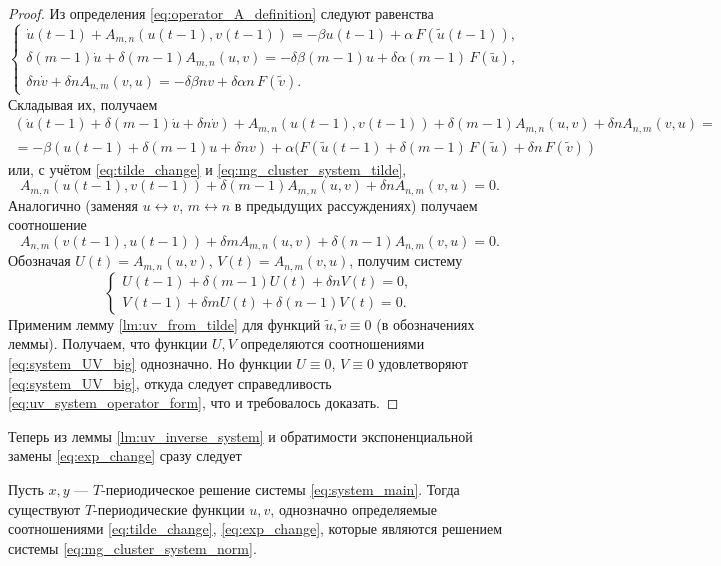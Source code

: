 \begin{proof}
	Из определения \eqref{eq:operator_A_definition} следуют равенства
	\[
	\begin{cases}
		\dot{u}(t - 1) + A_{m, n}(u(t - 1), v(t - 1))  = -\beta u(t - 1) + \alpha \, F(\tilde{u}(t - 1)),\\
		\delta (m - 1)\dot{u} + \delta (m - 1) A_{m, n}(u, v)  = -\delta \beta (m - 1) u + \delta \alpha (m - 1) \, F(\tilde{u}),\\
		\delta n \dot{v} + \delta n A_{n, m}(v, u)  = -\delta \beta n v + \delta \alpha n \, F(\tilde{v}).
	\end{cases}
	\]
	Складывая их, получаем
	\small
	\begin{multline*}   
		(\dot{u}(t - 1) + \delta (m - 1)\dot{u} + \delta n\dot{v}) + A_{m, n}(u(t - 1), v(t - 1)) + \delta (m - 1) A_{m, n}(u, v) + \delta n A_{n, m}(v, u) =\\= -\beta(u(t - 1) + \delta (m - 1) u + \delta n v) + \alpha(F(\tilde{u}(t - 1) + \delta (m - 1) \, F(\tilde{u}) + \delta n \, F(\tilde{v}))
	\end{multline*}
	\normalsize
	или, с учётом \eqref{eq:tilde_change} и \eqref{eq:mg_cluster_system_tilde},
	\[
	A_{m, n}(u(t - 1), v(t - 1)) + \delta (m - 1) A_{m, n}(u, v) + \delta n A_{n, m}(v, u) = 0.
	\]
	Аналогично (заменяя $u \leftrightarrow v$, $m \leftrightarrow n$ в предыдущих рассуждениях) получаем соотношение
	\[
	A_{n, m}(v(t - 1), u(t - 1)) + \delta m A_{m, n}(u, v) + \delta (n - 1) A_{n, m}(v, u) = 0.
	\]
	Обозначая $U(t) = A_{m, n}(u, v)$, $V(t) = A_{n, m}(v, u)$, получим систему
	\begin{equation}
		\label{eq:system_UV_big}
		\begin{cases}
			U(t - 1) + \delta (m - 1)U(t) + \delta n V(t) = 0,\\
			V(t - 1) + \delta m U(t) + \delta (n - 1) V(t) = 0.
		\end{cases}
	\end{equation}
	Применим лемму \ref{lm:uv_from_tilde} для функций $\tilde{u}, \tilde{v} \equiv 0$ (в обозначениях леммы). Получаем, что функции $U, V$ определяются соотношениями \eqref{eq:system_UV_big} однозначно. Но функции $U \equiv 0$, $V \equiv 0$ удовлетворяют \eqref{eq:system_UV_big}, откуда следует справедливость \eqref{eq:uv_system_operator_form}, что и требовалось доказать.
\end{proof}

Теперь из леммы \ref{lm:uv_inverse_system} и обратимости экспоненциальной замены \eqref{eq:exp_change} сразу следует
\begin{theorem}
	Пусть $x, y$ --- $T$-периодическое решение системы \eqref{eq:system_main}. Тогда существуют $T$-периодические функции $u, v$, однозначно определяемые соотношениями \eqref{eq:tilde_change}, \eqref{eq:exp_change}, которые являются решением системы \eqref{eq:mg_cluster_system_norm}.
\end{theorem}


